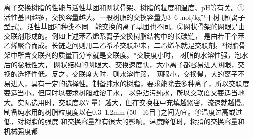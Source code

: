 离子交换树脂的性能与活性基团和网状骨架、树脂的粒度和温度、pH等有关。①活性基团越多，交换容量越大。一般树脂的交换容量为3~6 mol/kg⁻¹干树
脂(离子型式)。活性基团和种类不同，能交换的离子基团也不同。②网状骨架的网眼是由交联剂形成的。例如上述苯乙烯系离子交换树脂结构中的长碳链，
是由若干个苯乙烯聚合而成。长链之间则用二乙希苯交联起来，二乙烯苯就是交联剂。*树脂骨架中所含交联剂的质量百分率就是交联度。*交联度小时，
树脂的水溶性强，泡水后的膨胀性大， 网状结构的网眼大、交换速度快，大小离子都容易进人网眼，交换的选择性低。反之，交联度大时，则水溶性弱，
网眼小，交换慢，大的离子不易进人，具有一定的选择性。制备纯水的树脂，要求能除去多种离子，所以交联度要适当小。但同时以要求树脂难溶于水，
以免沾污纯水，所以交联度又要适当地大。实际选用时，交联度以7%
量）越大，但在交换柱中充填越紧密，流速就越慢。制备纯水用的树脂粒度度以在0.3~1.2mm (50~ 16目 )之间为宜。④温度过高或过低，对树脂的强度
和交换容量都有很大的影响。温度降低时，树脂的交换容量和机械强度都
